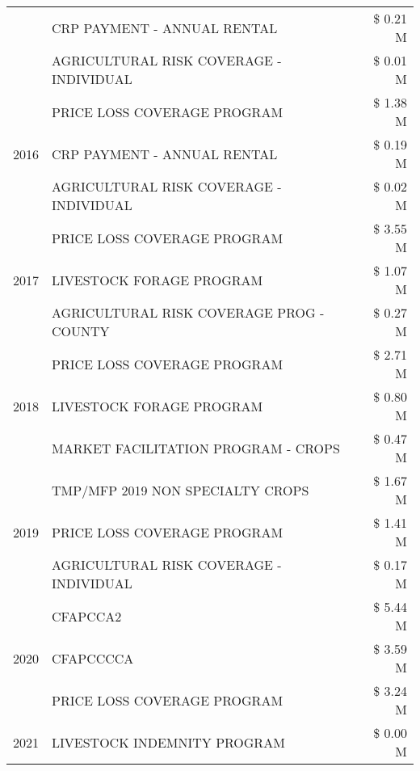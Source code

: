 \begin{tabular}{llr}
 & CRP PAYMENT - ANNUAL RENTAL & \$ 0.21 M \\
 & AGRICULTURAL RISK COVERAGE - INDIVIDUAL & \$ 0.01 M \\
\cline{1-3}
\multirow[t]{3}{*}{2016} & PRICE LOSS COVERAGE PROGRAM & \$ 1.38 M \\
 & CRP PAYMENT - ANNUAL RENTAL & \$ 0.19 M \\
 & AGRICULTURAL RISK COVERAGE - INDIVIDUAL & \$ 0.02 M \\
\cline{1-3}
\multirow[t]{3}{*}{2017} & PRICE LOSS COVERAGE PROGRAM & \$ 3.55 M \\
 & LIVESTOCK FORAGE PROGRAM & \$ 1.07 M \\
 & AGRICULTURAL RISK COVERAGE PROG - COUNTY & \$ 0.27 M \\
\cline{1-3}
\multirow[t]{3}{*}{2018} & PRICE LOSS COVERAGE PROGRAM & \$ 2.71 M \\
 & LIVESTOCK FORAGE PROGRAM & \$ 0.80 M \\
 & MARKET FACILITATION PROGRAM - CROPS & \$ 0.47 M \\
\cline{1-3}
\multirow[t]{3}{*}{2019} & TMP/MFP 2019 NON SPECIALTY CROPS & \$ 1.67 M \\
 & PRICE LOSS COVERAGE PROGRAM & \$ 1.41 M \\
 & AGRICULTURAL RISK COVERAGE - INDIVIDUAL & \$ 0.17 M \\
\cline{1-3}
\multirow[t]{3}{*}{2020} & CFAPCCA2 & \$ 5.44 M \\
 & CFAPCCCCA & \$ 3.59 M \\
 & PRICE LOSS COVERAGE PROGRAM & \$ 3.24 M \\
\cline{1-3}
2021 & LIVESTOCK INDEMNITY PROGRAM & \$ 0.00 M \\
\cline{1-3}
\bottomrule
\end{tabular}
